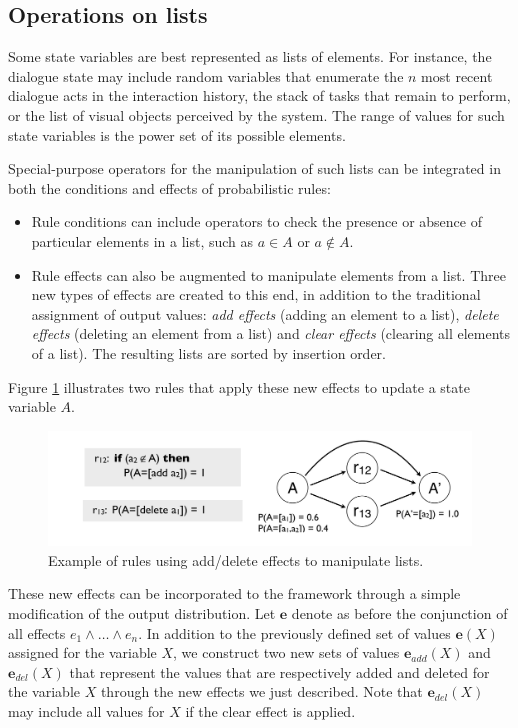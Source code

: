 \subsection{Operations on lists}

Some state variables are best represented as lists of elements. For instance, the dialogue state may include random variables that enumerate  the $n$ most recent dialogue acts in the interaction history, the stack of tasks that remain to perform, or the list of visual objects perceived by the system.  The range of values for such state variables is the power set of its possible elements. 


Special-purpose operators for the manipulation of such lists can be integrated in both the conditions and effects of probabilistic rules: 
\begin{itemize}
\item Rule conditions can include operators to check the presence or absence of particular elements in a list, such as $a \in A$ or $a \notin A$. 
\item Rule effects can also be augmented to manipulate elements from a list.  Three new types of effects are created to this end, in addition to the traditional assignment of output values: \textit{add effects} (adding an element to a list), \textit{delete effects} (deleting an element from a list) and \textit{clear effects} (clearing all elements of a list). The resulting lists are sorted by insertion order. 
\end{itemize}

Figure \ref{fig:seteffects} illustrates two rules that apply these new effects to update a state variable $A$. 
 
\begin{figure}[h]
\centering
\includegraphics[scale=0.25]{imgs/seteffects.pdf}
\caption{Example of rules using add/delete effects to manipulate lists.}
\label{fig:seteffects}
\end{figure}

These new effects can be incorporated to the framework through a simple modification of the output distribution. Let $\mathbf{e}$ denote as before the conjunction of all effects $e_1 \land \dots \land e_n$. In addition to the previously defined set of values $\mathbf{e}(X)$ assigned for the variable $X$, we construct two new sets of values $\mathbf{e}_{add}(X)$ and $\mathbf{e}_{del}(X)$ that represent the values that are respectively added and deleted for the variable $X$ through the new effects we just described. Note that $\mathbf{e}_{del}(X)$ may include all values for $X$ if the clear effect is applied. 

